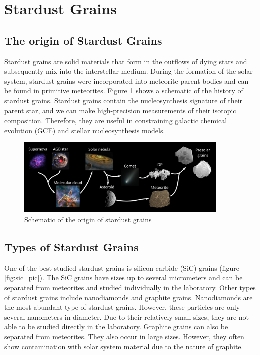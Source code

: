\documentclass{brandeis-thesis3.2}
\begin{document}
\section{Stardust Grains}
\subsection{The origin of Stardust Grains}
Stardust grains are solid materials that form in the outflows of dying stars and subsequently mix into the interstellar medium. During the formation of the solar system, stardust grains were incorporated into meteorite parent bodies and can be found in primitive meteorites. Figure \ref{fig:stardust_origin} shows a schematic of the history of stardust grains. Stardust grains contain the nucleosynthesis signature of their parent star, and we can make high-precision measurements of their isotopic composition. Therefore, they are useful in constraining galactic chemical evolution (GCE) and stellar nucleosynthesis models.

\begin{figure}[htbp]
\centering
\includegraphics[width = 0.9\textwidth]{figs/presolar_grains_origin_1600.png}
\caption{Schematic of the origin of stardust grains}
\label{fig:stardust_origin}
\end{figure}

\subsection{Types of Stardust Grains}
One of the best-studied stardust grains is silicon carbide (SiC) grains (figure \ref{fig:sic_pic}). The SiC grains have sizes up to several micrometers and can be separated from meteorites and studied individually in the laboratory. Other types of stardust grains include nanodiamonds and graphite grains. Nanodiamonds are the most abundant type of stardust grains. However, these particles are only several nanometers in diameter. Due to their relatively small sizes, they are not able to be studied directly in the laboratory. Graphite grains can also be separated from meteorites. They also occur in large sizes. However, they often show contamination with solar system material due to the nature of graphite.
\end{document}
